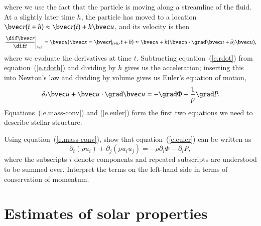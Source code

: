 where we use the fact that the particle is moving along a streamline of the fluid. At a slightly later time $h$, the particle has moved to a location $\vr(t + h) \approx \vr(t) + h\vu$, and its velocity is then
\begin{equation}\label{e.rdoth}
\left.\frac{\dif\vr}{\dif t}\right|_{t+h} = \vu(\vx = \vr|_{t+h},t+h)\approx \vu + h(\vu\cdot\grad\vu + \partial_{t}\vu),
\end{equation}
where we evaluate the derivatives at time $t$. Subtracting equation~(\ref{e.rdot}) from equation~(\ref{e.rdoth}) and dividing by $h$ gives us the acceleration; inserting this into Newton's law and dividing by volume gives us Euler's equation of motion,
\begin{equation}\label{e.euler}
\partial_{t}\vu + \vu\cdot\grad\vu = -\grad \Phi - \frac{1}{\rho}\grad P.
\end{equation}
Equations~(\ref{e.mass-conv}) and (\ref{e.euler}) form the first two equations we need to describe stellar structure.

\begin{exercisebox}
Using equation~(\ref{e.mass-conv}), show that equation~(\ref{e.euler}) can be written as
\begin{equation}\label{e.momentum-conv}
\partial_{t}(\rho u_{i}) + \partial_{j}(\rho u_{i}u_{j}) = -\rho\partial_{i}\Phi - \partial_{i}P,
\end{equation}
where the subscripts $i$ denote components and repeated subscripts are understood to be summed over. Interpret the terms on the left-hand side in terms of conservation of momentum.
\end{exercisebox}


\section{Estimates of solar properties}

